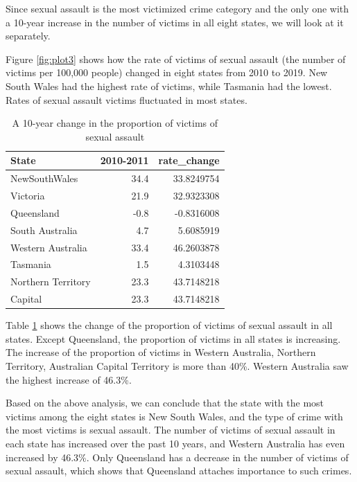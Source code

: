 \documentclass[11pt,a4paper,]{article}
\begin{document}
Since sexual assault is the most victimized crime category and the only one with a 10-year increase in the number of victims in all eight states, we will look at it separately.

Figure \ref{fig:plot3} shows how the rate of victims of sexual assault (the number of victims per 100,000 people) changed in eight states from 2010 to 2019. New South Wales had the highest rate of victims, while Tasmania had the lowest. Rates of sexual assault victims fluctuated in most states.

\begin{table}

\caption{\label{tab:table3}A 10-year change in the proportion of victims of sexual assault}
\centering
\begin{tabular}[t]{lrr}
\toprule
State & 2010-2011 & rate\_change\\
\midrule
NewSouthWales & 34.4 & 33.8249754\\
Victoria & 21.9 & 32.9323308\\
Queensland & -0.8 & -0.8316008\\
South Australia & 4.7 & 5.6085919\\
Western Australia & 33.4 & 46.2603878\\
\addlinespace
Tasmania & 1.5 & 4.3103448\\
Northern Territory & 23.3 & 43.7148218\\
Capital & 23.3 & 43.7148218\\
\bottomrule
\end{tabular}
\end{table}

Table \ref{tab:table3} shows the change of the proportion of victims of sexual assault in all states. Except Queensland, the proportion of victims in all states is increasing. The increase of the proportion of victims in Western Australia, Northern Territory, Australian Capital Territory is more than 40\%. Western Australia saw the highest increase of 46.3\%.

Based on the above analysis, we can conclude that the state with the most victims among the eight states is New South Wales, and the type of crime with the most victims is sexual assault. The number of victims of sexual assault in each state has increased over the past 10 years, and Western Australia has even increased by 46.3\%. Only Queensland has a decrease in the number of victims of sexual assault, which shows that Queensland attaches importance to such crimes.

\clearpage
\end{document}
